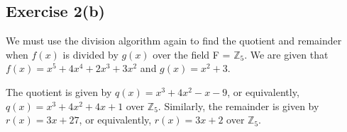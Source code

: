 \subsection*{Exercise 2(b)}
We must use the division algorithm again to find the quotient and remainder when $f(x)$ is divided by $g(x)$ over the field F = $\mathbb{Z}_5$. We are given that $f(x) = x^5 + 4x^4 + 2x^3 + 3x^2$ and $g(x) = x^2 + 3$.


The quotient is given by $q(x) = x^3 + 4x^2 - x - 9$, or equivalently, $q(x) = x^3 + 4x^2 + 4x + 1$ over $\mathbb{Z}_5$. Similarly, the remainder is given by $r(x) = 3x + 27$, or equivalently, $r(x) = 3x + 2$ over $\mathbb{Z}_5$.